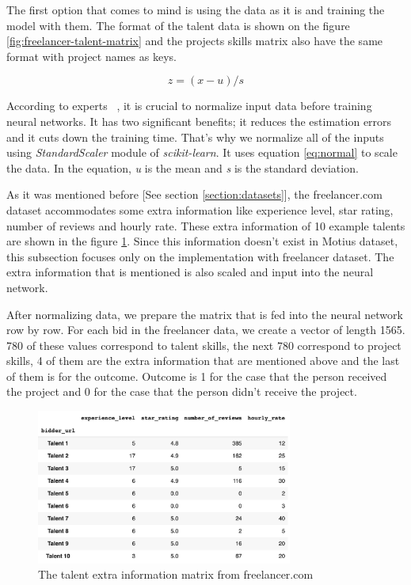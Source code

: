 The first option that comes to mind is using the data as it is and training the model with them. The format of the talent data is shown on the figure \ref{fig:freelancer-talent-matrix} and the projects skills matrix also have the same format with project names as keys.

\begin{equation}
z = (x - u) / s
\label{eq:normal}
\end{equation}

According to experts ~\parencite{sola1997importance}, it is crucial to normalize input data before training neural networks. It has two significant benefits; it reduces the estimation errors and it cuts down the training time. That's why we normalize all of the inputs using \textit{StandardScaler} module of \textit{scikit-learn}. It uses equation \ref{eq:normal} to scale the data. In the equation, \textit{u} is the mean and \textit{s} is the standard deviation.

As it was mentioned before [See section \ref{section:datasets}], the freelancer.com dataset accommodates some extra information like experience level, star rating, number of reviews and hourly rate. These extra information of 10 example talents are shown in the figure \ref{fig:freelancer-talent-meta}. Since this information doesn't exist in Motius dataset, this subsection focuses only on the implementation with freelancer dataset. The extra information that is mentioned is also scaled and input into the neural network. 


After normalizing data, we prepare the matrix that is fed into the neural network row by row. For each bid in the freelancer data, we create a vector of length 1565. 780 of these values correspond to talent skills, the next 780 correspond to project skills, 4 of them are the extra information that are mentioned above and the last of them is for the outcome. Outcome is 1 for the case that the person received the project and 0 for the case that the person didn't receive the project.


\begin{figure}[!ht]
	\centering
	\includegraphics[width=0.75\textwidth]{figures/FreelancerTalentMeta.png}
	\caption{The talent extra information matrix from freelancer.com}
	\label{fig:freelancer-talent-meta}
\end{figure}

